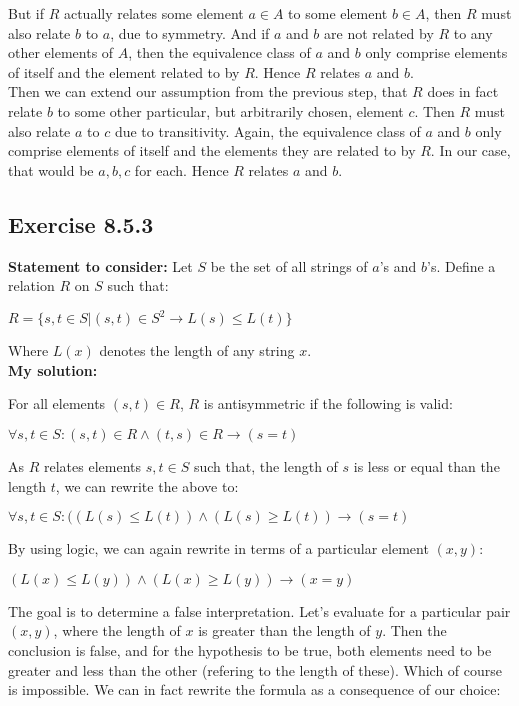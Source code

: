 \documentclass{report}
\newcommand{\cent}[1]{\begin{center}#1\end{center}}
\newcommand{\In}{\! \in \!}
\newcommand{\assignmentDescription}{\textbf{Statement to consider: }}
\newcommand{\solution}{\textbf{My solution: }}
\newcommand{\QED}{\boxed{}}
\newcommand{\Exercise}[1]{\subsection{Exercise #1}}
\begin{document}
	But if $R$ actually relates some element $a \In A$ to some element $b \In A$, then $R$ must also relate $b$ to $a$, due to symmetry. And if $a$ and $b$ are not related by $R$ to any other elements of $A$, then the equivalence class of $a$ and $b$ only comprise elements of itself and the element related to by $R$. Hence $R$ relates $a$ and $b$.\\
	
	Then we can extend our assumption from the previous step, that $R$ does in fact relate $b$ to some other particular, but arbitrarily chosen, element $c$. Then $R$ must also relate $a$ to $c$ due to transitivity. Again, the equivalence class of $a$ and $b$ only comprise elements of itself and the elements they are related to by $R$. In our case, that would be $a,b,c$ for each. Hence $R$ relates $a$ and $b$.\\
	\QED
	
	\Exercise{8.5.3}
	\assignmentDescription
	Let $S$ be the set of all strings of $a$'s and $b$'s. Define a relation $ R $ on $ S $ such that:
	
	\cent{$ R = \{s,t \In S | (s,t) \In S^2 \to L(s) \leq L(t)\}$} 
	
	Where $L(x)$ denotes the length of any string $x$.\\
	
	\solution
	
	For all elements $(s,t) \In R$, $R$ is antisymmetric if the following is valid:
	
	\cent{$\forall s,t \In S : (s,t) \In R \wedge (t,s) \In R \to (s = t)$}
	
	As $R$ relates elements $s,t \In S$ such that, the length of $s$ is less or equal than the length $t$, we can rewrite the above to:
	
	\cent{$\forall s,t \In S : ((L(s) \leq L(t)) \wedge (L(s) \geq L(t))\to (s = t)$}
	
	By using logic, we can again rewrite in terms of a particular element $(x,y)$: 
	
	\cent{$(L(x) \leq L(y)) \wedge (L(x) \geq L(y))\to (x = y)$}
	
	The goal is to determine a false interpretation. Let's evaluate for a particular pair $(x,y)$, where the length of $x$ is greater than the length of $y$. Then the conclusion is false, and for the hypothesis to be true, both elements need to be greater and less than the other (refering to the length of these). Which of course is impossible. We can in fact rewrite the formula as a consequence of our choice:
	
\end{document}
